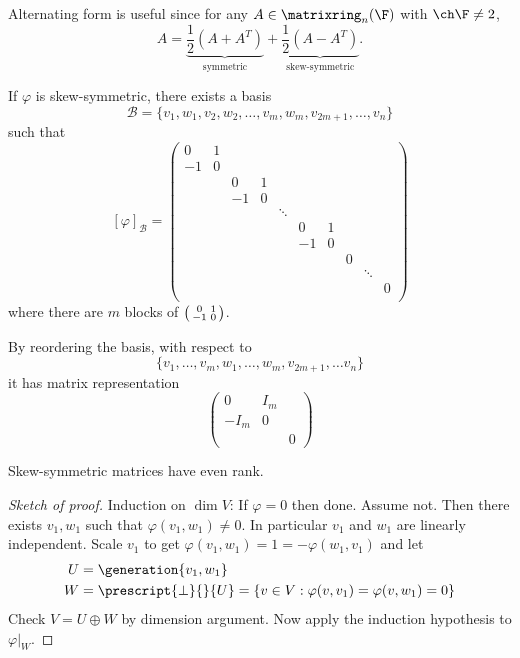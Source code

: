 \documentclass[a4paper]{article}
\newcommand*{\M}{\matrixring}
\newcommand*{\spans}{\generation}
\newcommand*{\basis}{\mathcal}
\theoremstyle{definition}
\begin{document}
\begin{remark}
  Alternating form is useful since for any \(A \in \M_n(\F)\) with \(\ch \F \neq 2\),
  \[
    A = \underbrace{\frac{1}{2}(A + A^T)}_{\text{symmetric}} + \underbrace{\frac{1}{2}(A - A^T)}_{\text{skew-symmetric}}.
  \]
\end{remark}

\begin{theorem}
  If \(\varphi\) is skew-symmetric, there exists a basis
  \[
    \basis B = \{v_1, w_1, v_2, w_2, \dots, v_m, w_m, v_{2m + 1}, \dots, v_n\}
  \]
  such that
  \[
    [\varphi]_{\basis B} =
    \begin{pmatrix}
      0 & 1 & & & & & & & & \\
      -1 & 0 & & & & & & & & \\
      & & 0 & 1 & & & & & & \\
      & & -1 & 0 & & & & & & \\
      & & & & \ddots & & & & & \\
      & & & & & 0 & 1 & & & \\
      & & & & & -1 & 0 & & & \\
      & & & & & & & 0 & &\\
      & & & & & & & & \ddots & \\
      & & & & & & & & & 0 \\
    \end{pmatrix}
  \]
  where there are \(m\) blocks of \(\begin{psmallmatrix} 0 & 1 \\ -1 & 0 \end{psmallmatrix}\).
\end{theorem}

\begin{remark}
  By reordering the basis, with respect to
  \[
    \{v_1, \dots, v_m, w_1, \dots, w_m, v_{2m + 1}, \dots v_n\}
  \]
  it has matrix representation
  \[
    \begin{pmatrix}
      0 & I_m & \\
      -I_m & 0 & \\
      & & 0
    \end{pmatrix}
  \]
\end{remark}

\begin{remark}
  Skew-symmetric matrices have even rank.
\end{remark}

\begin{proof}[Sketch of proof]
  Induction on \(\dim V\): If \(\varphi = 0\) then done. Assume not. Then there exists \(v_1, w_1\) such that \(\varphi(v_1, w_1) \neq 0\). In particular \(v_1\) and \(w_1 \) are linearly independent. Scale \(v_1\) to get \(\varphi(v_1, w_1) = 1 = -\varphi(w_1, v_1)\) and let
  \begin{align*}
    U &= \spans{v_1, w_1} \\
    W &= \prescript{\perp}{}{U} = \{ v\in V: \varphi(v, v_1) = \varphi(v, w_1) = 0 \}
  \end{align*}
  Check \(V = U \oplus W\) by dimension argument. Now apply the induction hypothesis to \(\varphi|_W\).
\end{proof}
\end{document}
